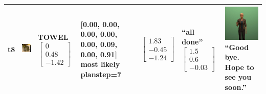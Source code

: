 \begin{longtable}{| V{0.8cm} | V{2.6cm} | V{1.6cm} | V{2.1cm} | V{1.55cm} | V{1.6cm} | V{3.2cm} |}
t8 &
\includegraphics[width=\linewidth]{fig/system/_slow2-towel_.jpg} &
TOWEL
\linebreak\linebreak
$\begin{bmatrix}
0 \\
0.48 \\
-1.42
\end{bmatrix}$ &
[0.00, 0.00, 0.00, 0.00, 0.00, 0.09, 0.00, 0.91] most likely planstep=7 &
$\begin{bmatrix}
1.83 \\
-0.45 \\
-1.24
\end{bmatrix}$ &
``all done''
\linebreak\linebreak
$\begin{bmatrix}
1.5 \\
0.6 \\
-0.03
\end{bmatrix}$ &
\includegraphics[width=2.6cm]{fig/prompt/_hope-to-see-you-soon_.jpg}
\linebreak
\footnotesize
``Good bye. Hope to see you soon.''
\\ \hline

\end{longtable}



